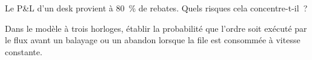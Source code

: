 \begin{interviewq}\label{iq:hf:rebates-inverted-venues-and-tiers:5}
Le P\&L d'un desk provient à 80~\% de rebates. Quels risques cela concentre-t-il~?
\end{interviewq}

\begin{interviewq}\label{iq:hf:rebates-inverted-venues-and-tiers:6}
Dans le modèle à trois horloges, établir la probabilité que l'ordre soit exécuté par le flux avant un balayage ou un abandon lorsque la file est consommée
à vitesse constante.
\end{interviewq}
